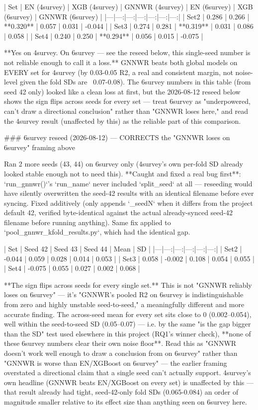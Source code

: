 | Set | EN (4survey) | XGB (4survey) | GNNWR (4survey) | EN (6survey) | XGB (6survey) | GNNWR (6survey) |
|---|---:|---:|---:|---:|---:|---:|
| Set2 | 0.286 | 0.266 | **0.320** | 0.057 | 0.031 | -0.044 |
| Set3 | 0.274 | 0.281 | **0.319** | 0.031 | 0.086 | 0.058 |
| Set4 | 0.240 | 0.250 | **0.294** | 0.056 | 0.015 | -0.075 |

**Yes on 4survey. On 6survey — see the reseed below, this single-seed number is not reliable
enough to call it a loss.** GNNWR beats both global models on EVERY set for 4survey (by 0.03-0.05
R2, a real and consistent margin, not noise-level given the fold SDs are ~0.07-0.08). The 6survey
numbers in this table (from seed 42 only) looked like a clean loss at first, but the 2026-08-12
reseed below shows the sign flips across seeds for every set — treat 6survey as "underpowered,
can't draw a directional conclusion" rather than "GNNWR loses here," and read the 4survey result
(unaffected by this) as the reliable part of this comparison.

### 6survey reseed (2026-08-12) — CORRECTS the "GNNWR loses on 6survey" framing above

Ran 2 more seeds (43, 44) on 6survey only (4survey's own per-fold SD already looked stable enough
not to need this). **Caught and fixed a real bug first**: `run_gnnwr()`'s `run_name` never
included `split_seed` at all — reseeding would have silently overwritten the seed-42 results with
an identical filename before ever syncing. Fixed additively (only appends `_seed{N}` when it
differs from the project default 42, verified byte-identical against the actual already-synced
seed-42 filename before running anything). Same fix applied to
`pool_gnnwr_kfold_results.py`, which had the identical gap.

| Set | Seed 42 | Seed 43 | Seed 44 | Mean | SD |
|---|---:|---:|---:|---:|---:|
| Set2 | -0.044 | 0.059 | 0.028 | 0.014 | 0.053 |
| Set3 | 0.058 | -0.002 | 0.108 | 0.054 | 0.055 |
| Set4 | -0.075 | 0.055 | 0.027 | 0.002 | 0.068 |

**The sign flips across seeds for every single set.** This is not "GNNWR reliably loses on
6survey" — it's "GNNWR's pooled R2 on 6survey is indistinguishable from zero and highly unstable
seed-to-seed," a meaningfully different and more accurate finding. The across-seed mean for every
set sits close to 0 (0.002–0.054), well within the seed-to-seed SD (0.05–0.07) — i.e. by the same
"is the gap bigger than the SD" test used elsewhere in this project (RQ1's winner check), **none
of these 6survey numbers clear their own noise floor**. Read this as "GNNWR doesn't work well
enough to draw a conclusion from on 6survey" rather than "GNNWR is worse than EN/XGBoost on
6survey" — the earlier framing overstated a directional claim that a single seed can't actually
support. 4survey's own headline (GNNWR beats EN/XGBoost on every set) is unaffected by this —
that result already had tight, seed-42-only fold SDs (0.065-0.084) an order of magnitude smaller
relative to its effect size than anything seen on 6survey here.

